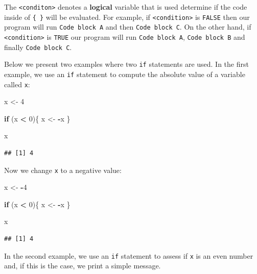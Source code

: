 \documentclass[12pt,]{krantz}
\newenvironment{Shaded}{\begin{snugshade}}{\end{snugshade}}
\newcommand{\KeywordTok}[1]{\textcolor[rgb]{0.27,0.27,0.27}{\textbf{#1}}}
\newcommand{\DecValTok}[1]{\textcolor[rgb]{0.06,0.06,0.06}{#1}}
\newcommand{\StringTok}[1]{\textcolor[rgb]{0.5,0.5,0.5}{#1}}
\newcommand{\ControlFlowTok}[1]{\textcolor[rgb]{0.27,0.27,0.27}{\textbf{#1}}}
\newcommand{\OperatorTok}[1]{\textcolor[rgb]{0.43,0.43,0.43}{\textbf{#1}}}
\newcommand{\NormalTok}[1]{#1}
\begin{document}
The \texttt{\textless{}conditon\textgreater{}} denotes a
\textbf{logical} variable that is used determine if the code inside of
\texttt{\{\ \}} will be evaluated. For example, if
\texttt{\textless{}condition\textgreater{}} is \texttt{FALSE} then our
program will run \texttt{Code\ block\ A} and then
\texttt{Code\ block\ C}. On the other hand, if
\texttt{\textless{}condition\textgreater{}} is \texttt{TRUE} our program
will run \texttt{Code\ block\ A}, \texttt{Code\ block\ B} and finally
\texttt{Code\ block\ C}.

Below we present two examples where two \texttt{if} statements are used.
In the first example, we use an \texttt{if} statement to compute the
absolute value of a variable called \texttt{x}:

\begin{Shaded}
\begin{Highlighting}[]
\NormalTok{x <-}\StringTok{ }\DecValTok{4}

\ControlFlowTok{if}\NormalTok{ (x }\OperatorTok{<}\StringTok{ }\DecValTok{0}\NormalTok{)\{}
\NormalTok{  x <-}\StringTok{ }\OperatorTok{-}\NormalTok{x}
\NormalTok{\}}

\NormalTok{x}
\end{Highlighting}
\end{Shaded}

\begin{verbatim}
## [1] 4
\end{verbatim}

Now we change \texttt{x} to a negative value:

\begin{Shaded}
\begin{Highlighting}[]
\NormalTok{x <-}\StringTok{ }\OperatorTok{-}\DecValTok{4}

\ControlFlowTok{if}\NormalTok{ (x }\OperatorTok{<}\StringTok{ }\DecValTok{0}\NormalTok{)\{}
\NormalTok{  x <-}\StringTok{ }\OperatorTok{-}\NormalTok{x}
\NormalTok{\}}

\NormalTok{x}
\end{Highlighting}
\end{Shaded}

\begin{verbatim}
## [1] 4
\end{verbatim}

In the second example, we use an \texttt{if} statement to assess if
\texttt{x} is an even number and, if this is the case, we print a simple
message.

\begin{Shaded}
\end{Shaded}
\end{document}
